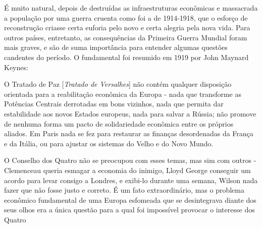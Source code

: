 É muito natural, depois de destruídas as infraestruturas econômicas e massacrada a população por uma guerra cruenta como foi a de 1914-1918, que o esforço de reconstrução criasse certa euforia pelo novo e certa alegria pela nova vida. Para outros países, entretanto, as consequências da Primeira Guerra Mundial foram mais graves, e são de suma importância para entender algumas questões candentes do período. O fundamental foi resumido em 1919 por John Maynard Keynes:

\begin{citacao}
O Tratado de Paz [\textit{Tratado de Versalhes}] não contém qualquer disposição orientada para a reabilitação econômica da Europa - nada que transforme as Potências Centrais derrotadas em bons vizinhos, nada que permita dar estabilidade aos novos Estados europeus, nada para salvar a Rússia; não promove de nenhuma forma um pacto de solidariedade econômica entre os próprios aliados. Em Paris nada se fez para restaurar as finanças desordenadas da França e da Itália, ou para ajustar os sistemas do Velho e do Novo Mundo.

O Conselho dos Quatro não se preocupou com esses temas, mas sim com outros - Clemenceau queria esmagar a economia do inimigo, Lloyd George conseguir um acordo para levar consigo a Londres, e exibi-lo durante uma semana, Wilson nada fazer que não fosse justo e correto. É um fato extraordinário, mas o problema econômico fundamental de uma Europa esfomeada que se desintegrava diante dos seus olhos era a única questão para a qual foi impossível provocar o interesse dos Quatro \cite[p.~157]{keynes_paz_2002}
\end{citacao}

